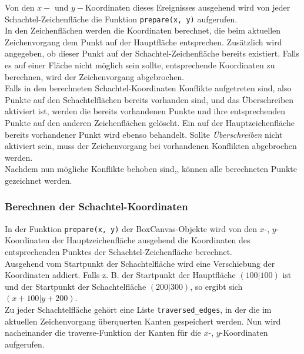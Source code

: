Von den $x - $ und $y - $Koordinaten dieses Ereignisses ausgehend wird von jeder Schachtel-Zeichenfläche die Funktion \texttt{prepare(x, y)} aufgerufen.\\

In den Zeichenflächen werden die Koordinaten berechnet, die beim aktuellen Zeichenvorgang dem Punkt auf der Hauptfläche entsprechen. Zusätzlich wird angegeben, ob dieser Punkt auf der Schachtel-Zeichenfläche bereits existiert. Falls es auf einer Fläche nicht möglich sein sollte, entsprechende Koordinaten zu berechnen, wird der Zeichenvorgang abgebrochen.\\

Falls in den berechneten Schachtel-Koordinaten Konflikte aufgetreten sind, also Punkte auf den Schachtelflächen bereits vorhanden sind, und das Überschreiben aktiviert ist, werden die bereits vorhandenen Punkte und ihre entsprechenden Punkte auf den anderen Zeichenflächen gelöscht. Ein auf der Hauptzeichenfläche bereits vorhandener Punkt wird ebenso behandelt. Sollte \emph{Überschreiben} nicht aktiviert sein, muss der Zeichenvorgang bei vorhandenen Konflikten abgebrochen werden.\\

Nachdem nun mögliche Konflikte behoben sind,, können alle berechneten Punkte gezeichnet werden.\\


\subsubsection{Berechnen der Schachtel-Koordinaten}
\label{subsubsec:schachtelkoordinaten}

In der Funktion \texttt{prepare(x, y)} der BoxCanvas-Objekte wird von den $x$-, $y$-Koordinaten der Hauptzeichenfläche ausgehend die Koordinaten des entsprechenden Punktes der Schachtel-Zeichenfläche berechnet.\\

Ausgehend vom Startpunkt der Schachtelfläche wird eine Verschiebung der Koordinaten addiert. Falls z. B. der Startpunkt der Hauptfläche $(100|100)$ ist und der Startpunkt der Schachtelfläche $(200|300)$, so ergibt sich $(x+100|y+200)$.\\

Zu jeder Schachtelfläche gehört eine Liste \texttt{traversed\_edges}, in der die im aktuellen Zeichenvorgang überquerten Kanten gespeichert werden. Nun wird nacheinander die traverse-Funktion der Kanten für die $x$-, $y$-Koordinaten aufgerufen.\\

